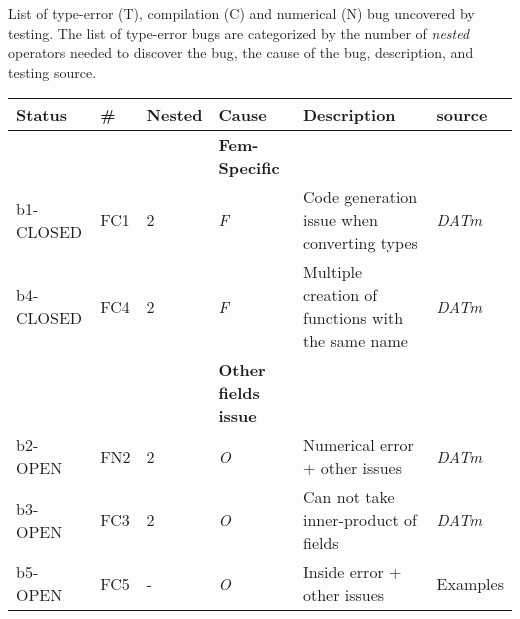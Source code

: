 \documentclass{article}
\newcommand{\fontit}[1]{\textit{#1}}
\newcommand{\checkname}[0]{\textit{DATm}}
\begin{document}
List of type-error (T), compilation (C) and numerical (N) bug uncovered by testing.
 The list of type-error bugs are categorized by the number of \fontit{nested} operators needed to discover the bug,  the cause of the bug, description, and testing source.
\newline 
\begin{tabular}{|l|llll|l|}
\hline
Status & \# &Nested & Cause & Description & source\\
\hline \hline &&&\textbf{Fem-Specific}&&\\
b1-CLOSED &FC1 &2&\fontit{F}&Code generation issue when converting types&\checkname{}\\
b4-CLOSED &FC4 &2&\fontit{F}&Multiple creation of functions with the same name &\checkname{}\\
&&&\textbf{Other fields issue}&&\\
b2-OPEN &FN2 &2&\fontit{O}&Numerical error + other issues&\checkname{}\\
b3-OPEN &FC3 &2&\fontit{O}& Can not take inner-product of fields&\checkname{} \\
b5-OPEN &FC5 &-&\fontit{O}& Inside error + other issues& Examples\\
\hline
\end{tabular}

\end{document}
